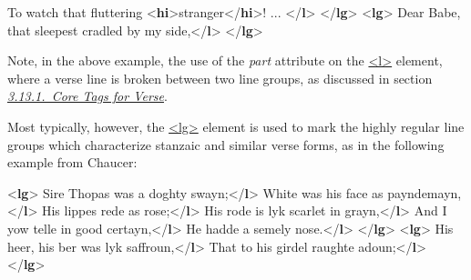 \begin{shaded}
To watch that fluttering {<\textbf{hi}>}stranger{</\textbf{hi}>}! ... {</\textbf{l}>}\mbox{}\newline 
{</\textbf{lg}>}\mbox{}\newline 
{<\textbf{lg}>}\mbox{}\newline 
{}Dear Babe, that sleepest cradled by my side,{</\textbf{l}>}\mbox{}\newline 
{</\textbf{lg}>}\end{shaded}\egroup\par \noindent   Note, in the above example, the use of the {\itshape part} attribute on the \hyperref[TEI.l]{<l>} element, where a verse line is broken between two line groups, as discussed in section \textit{\hyperref[COVE]{3.13.1.\ Core Tags for Verse}}.\par
Most typically, however, the \hyperref[TEI.lg]{<lg>} element is used to mark the highly regular line groups which characterize stanzaic and similar verse forms, as in the following example from Chaucer: \par\bgroup{}\exampleFont \begin{shaded}\noindent\mbox{}{<\textbf{lg}>}\mbox{}\newline 
{}Sire Thopas was a doghty swayn;{</\textbf{l}>}\mbox{}\newline 
{}White was his face as payndemayn,{</\textbf{l}>}\mbox{}\newline 
{}His lippes rede as rose;{</\textbf{l}>}\mbox{}\newline 
{}His rode is lyk scarlet in grayn,{</\textbf{l}>}\mbox{}\newline 
{}And I yow telle in good certayn,{</\textbf{l}>}\mbox{}\newline 
{}He hadde a semely nose.{</\textbf{l}>}\mbox{}\newline 
{</\textbf{lg}>}\mbox{}\newline 
{<\textbf{lg}>}\mbox{}\newline 
{}His heer, his ber was lyk saffroun,{</\textbf{l}>}\mbox{}\newline 
{}That to his girdel raughte adoun;{</\textbf{l}>}\mbox{}\newline 
{</\textbf{lg}>}\end{shaded}\egroup\par \noindent  \par
